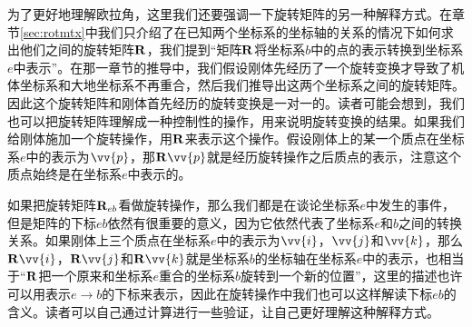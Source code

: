 \documentclass[11pt]{article}
\begin{document}
为了更好地理解欧拉角，这里我们还要强调一下旋转矩阵的另一种解释方式。在章节\ref{sec:rotmtx}中我们只介绍了在已知两个坐标系的坐标轴的关系的情况下如何求出他们之间的旋转矩阵${\bf R}$，我们提到“矩阵${\bf R}$将坐标系$b$中的点的表示转换到坐标系$e$中表示”。在那一章节的推导中，我们假设刚体先经历了一个旋转变换才导致了机体坐标系和大地坐标系不再重合，然后我们推导出这两个坐标系之间的旋转矩阵。因此这个旋转矩阵和刚体首先经历的旋转变换是一对一的。读者可能会想到，我们也可以把旋转矩阵理解成一种控制性的操作，用来说明旋转变换的结果。如果我们给刚体施加一个旋转操作，用${\bf R}$来表示这个操作。假设刚体上的某一个质点在坐标系$e$中的表示为$\vv{p}$，那${\bf R}\vv{p}$就是经历旋转操作之后质点的表示，注意这个质点始终是在坐标系$e$中表示的。

如果把旋转矩阵${\bf R}_{eb}$看做旋转操作，那么我们都是在谈论坐标系$e$中发生的事件，但是矩阵的下标$eb$依然有很重要的意义，因为它依然代表了坐标系$e$和$b$之间的转换关系。如果刚体上三个质点在坐标系$e$中的表示为$\vv{i}$，$\vv{j}$和$\vv{k}$，那么${\bf R}\vv{i}$，${\bf R}\vv{j}$和${\bf R}\vv{k}$就是坐标系$b$的坐标轴在坐标系$e$中的表示，也相当于“${\bf R}$把一个原来和坐标系$e$重合的坐标系$b$旋转到一个新的位置”，这里的描述也许可以用表示$e\rightarrow b$的下标来表示，因此在旋转操作中我们也可以这样解读下标$eb$的含义。读者可以自己通过计算进行一些验证，让自己更好理解这种解释方式。
\end{document}
